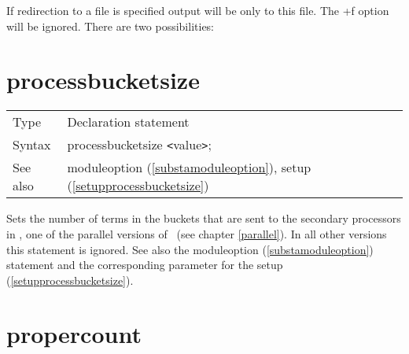 
\noindent If redirection to a file is specified output will be only to this 
file. The +f option will be ignored. There are two possibilities:


\vspace{10mm}


\section{processbucketsize}
\label{substaprocessbucketsize}

\noindent \begin{tabular}{ll}
Type & Declaration statement\\
Syntax & processbucketsize {\tt<}value{\tt>};
\\ See also & moduleoption (\ref{substamoduleoption}), setup 
(\ref{setupprocessbucketsize})
\end{tabular}\vspace{4mm}

\noindent Sets the number of terms in the buckets that are sent 
to the secondary processors in \ParFORM{}, one of the 
parallel versions of \FORM\ (see chapter \ref{parallel}). In 
all other versions this statement is ignored. See also the moduleoption 
(\ref{substamoduleoption}) statement and the corresponding parameter for 
the setup (\ref{setupprocessbucketsize}). \vspace{10mm}


\section{propercount}
\label{substapropercount}

